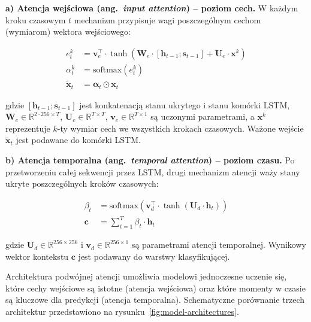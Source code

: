 \textbf{a) Atencja wejściowa (ang.~\emph{input attention}) -- poziom cech.}
W każdym kroku czasowym $t$ mechanizm przypisuje wagi poszczególnym cechom (wymiarom) wektora wejściowego:

\begin{align}
e_t^k &= \mathbf{v}_e^{\top} \cdot \tanh\left(\mathbf{W}_e \cdot [\mathbf{h}_{t-1}; \mathbf{s}_{t-1}] + \mathbf{U}_e \cdot \mathbf{x}^k\right) \label{eq:input-attn-energy} \\
\alpha_t^k &= \text{softmax}(e_t^k) \label{eq:input-attn-weights} \\
\tilde{\mathbf{x}}_t &= \boldsymbol{\alpha}_t \odot \mathbf{x}_t \label{eq:input-attn-weighted}
\end{align}

\noindent gdzie $[\mathbf{h}_{t-1}; \mathbf{s}_{t-1}]$ jest konkatenacją stanu ukrytego i stanu komórki LSTM, $\mathbf{W}_e \in \mathbb{R}^{2 \cdot 256 \times T}$, $\mathbf{U}_e \in \mathbb{R}^{T \times T}$, $\mathbf{v}_e \in \mathbb{R}^{T \times 1}$ są uczonymi parametrami, a $\mathbf{x}^k$ reprezentuje $k$-ty wymiar cech we wszystkich krokach czasowych. Ważone wejście $\tilde{\mathbf{x}}_t$ jest podawane do komórki LSTM.

\textbf{b) Atencja temporalna (ang.~\emph{temporal attention}) -- poziom czasu.}
Po przetworzeniu całej sekwencji przez LSTM, drugi mechanizm atencji waży stany ukryte poszczególnych kroków czasowych:

\begin{align}
\beta_t &= \text{softmax}\left(\mathbf{v}_d^{\top} \cdot \tanh\left(\mathbf{U}_d \cdot \mathbf{h}_t\right)\right) \label{eq:temp-attn-weights} \\
\mathbf{c} &= \sum_{t=1}^{T} \beta_t \cdot \mathbf{h}_t \label{eq:temp-attn-context}
\end{align}

\noindent gdzie $\mathbf{U}_d \in \mathbb{R}^{256 \times 256}$ i $\mathbf{v}_d \in \mathbb{R}^{256 \times 1}$ są parametrami atencji temporalnej. Wynikowy wektor kontekstu $\mathbf{c}$ jest podawany do warstwy klasyfikującej.

\vspace{0.3cm}

Architektura podwójnej atencji umożliwia modelowi jednoczesne uczenie się, które cechy wejściowe są istotne (atencja wejściowa) oraz które momenty w czasie są kluczowe dla predykcji (atencja temporalna). Schematyczne porównanie trzech architektur przedstawiono na rysunku~\ref{fig:model-architectures}.

